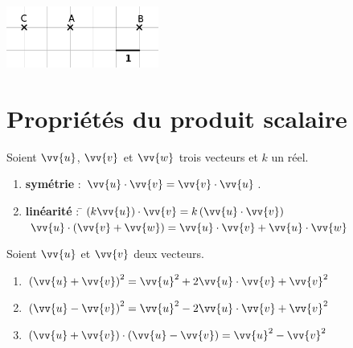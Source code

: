 \documentclass[a4paper,11pt,cours]{nsi} %
\begin{document}
\begin{exemple}[ 5]
    {\includegraphics[width=5cm]{exemple5.png}}
\end{exemple}

\section{Propriétés du produit scalaire}
\begin{propriete}[s]
    Soient $\vv{u}$, $\vv{v}$ et $\vv{w}$ trois vecteurs et $k$ un réel.
    \begin{enumerate}[label=\textbullet]
        \item \textbf{symétrie} : $\vv{u} \cdot \vv{v} = \vv{v} \cdot \vv{u}$.
        \item \begin{tabbing}
            \textbf{linéarité} :  \=$\left(k\vv{u}\right) \cdot \vv{v} = k\left(\vv{u} \cdot \vv{v}\right)$\\
            \> $\vv{u} \cdot \left(\vv{v}+ \vv{w}\right) = \vv{u} \cdot \vv{v}+\vv{u}\cdot \vv{w}$\\
        \end{tabbing}
    \end{enumerate}
\end{propriete}

\begin{propriete}
    Soient $\vv{u}$ et $\vv{v}$ deux vecteurs.
    \begin{enumerate}[label=\textbullet]
        \item $\left(\vv{u}+\vv{v}\right)^2 = \vv{u}^2  + 2\vv{u} \cdot \vv{v}+ \vv{v}^2$
        \item $\left(\vv{u}-\vv{v}\right)^2 = \vv{u}^2  - 2\vv{u} \cdot \vv{v}+ \vv{v}^2$
        \item $\left(\vv{u}+\vv{v}\right) \cdot \left(\vv{u}-\vv{v}\right) = \vv{u}^2 - \vv{v}^2$
    \end{enumerate}
\end{propriete}
\end{document}
